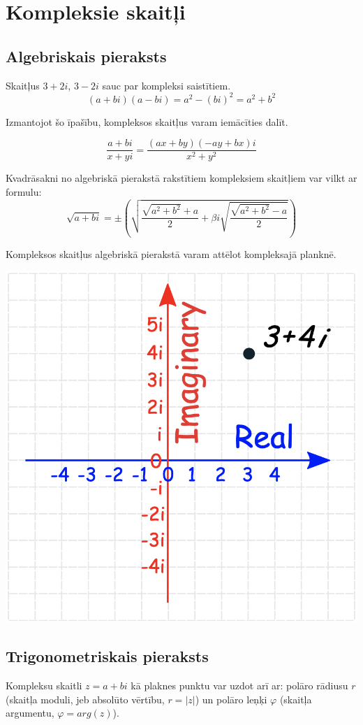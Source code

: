 \documentclass{article}
\begin{document}
\section{Kompleksie skaitļi}

\subsection{Algebriskais pieraksts}

Skaitļus $3+2i$, $3-2i$ sauc par kompleksi saistītiem.
\begin{equation}
	(a+bi)(a-bi)=a^2-(bi)^2=a^2+b^2
\end{equation}

Izmantojot šo īpašību, kompleksos skaitļus varam iemācīties dalīt.

\begin{equation}
	\frac{a+bi}{x+yi}
	= \frac{(ax+by)(-ay+bx)i}{x^2+y^2}
\end{equation}

Kvadrāsakni no algebriskā pierakstā rakstītiem kompleksiem skaitļiem var vilkt ar formulu:
\begin{equation}
	\sqrt{a+bi}=\pm
	\left(
	\sqrt{\frac{\sqrt{a^2+b^2}+a}{2}+\beta i\sqrt{\frac{\sqrt{a^2+b^2}-a}{2}}}
	\right)
\end{equation}

Kompleksos skaitļus algebriskā pierakstā varam attēlot kompleksajā planknē.

\begin{center}
	\includegraphics[width=.4\linewidth]{complex_plane-1}
\end{center}

\subsection{Trigonometriskais pieraksts}

Kompleksu skaitli $z =a+bi$ kā plaknes punktu var uzdot arī ar: polāro rādiusu $r$ (skaitļa moduli, jeb absolūto vērtību, $r=|z|$) un polāro leņķi $\varphi$ (skaitļa argumentu, $\varphi=arg(z)$).
\end{document}
